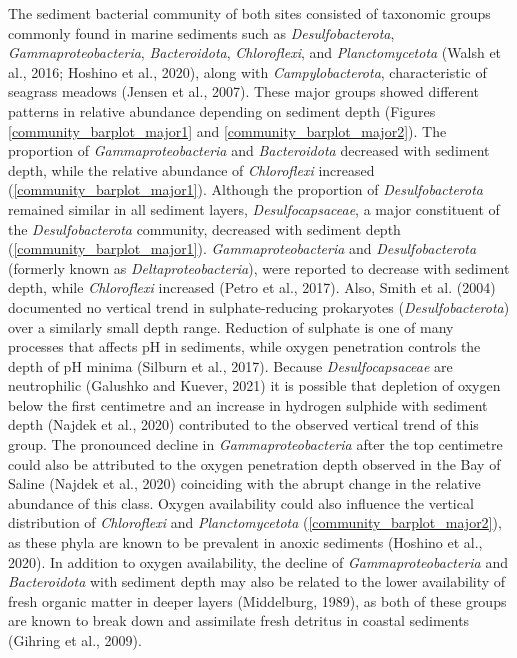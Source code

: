\documentclass[12pt,]{article}
\begin{document}
The sediment bacterial community of both sites consisted of taxonomic
groups commonly found in marine sediments such as
\emph{Desulfobacterota}, \emph{Gammaproteobacteria},
\emph{Bacteroidota}, \emph{Chloroflexi}, and \emph{Planctomycetota}
(Walsh et al., 2016; Hoshino et al., 2020), along with
\emph{Campylobacterota}, characteristic of seagrass meadows (Jensen et
al., 2007). These major groups showed different patterns in relative
abundance depending on sediment depth (Figures
\ref {community_barplot_major1} and \ref {community_barplot_major2}).
The proportion of \emph{Gammaproteobacteria} and \emph{Bacteroidota}
decreased with sediment depth, while the relative abundance of
\emph{Chloroflexi} increased (\autoref {community_barplot_major1}).
Although the proportion of \emph{Desulfobacterota} remained similar in
all sediment layers, \emph{Desulfocapsaceae}, a major constituent of the
\emph{Desulfobacterota} community, decreased with sediment depth
(\autoref {community_barplot_major1}). \emph{Gammaproteobacteria} and
\emph{Desulfobacterota} (formerly known as \emph{Deltaproteobacteria}),
were reported to decrease with sediment depth, while \emph{Chloroflexi}
increased (Petro et al., 2017). Also, Smith et al. (2004) documented no
vertical trend in sulphate-reducing prokaryotes
(\emph{Desulfobacterota}) over a similarly small depth range. Reduction
of sulphate is one of many processes that affects pH in sediments, while
oxygen penetration controls the depth of pH minima (Silburn et al.,
2017). Because \emph{Desulfocapsaceae} are neutrophilic (Galushko and
Kuever, 2021) it is possible that depletion of oxygen below the first
centimetre and an increase in hydrogen sulphide with sediment depth
(Najdek et al., 2020) contributed to the observed vertical trend of this
group. The pronounced decline in \emph{Gammaproteobacteria} after the
top centimetre could also be attributed to the oxygen penetration depth
observed in the Bay of Saline (Najdek et al., 2020) coinciding with the
abrupt change in the relative abundance of this class. Oxygen
availability could also influence the vertical distribution of
\emph{Chloroflexi} and \emph{Planctomycetota}
(\autoref {community_barplot_major2}), as these phyla are known to be
prevalent in anoxic sediments (Hoshino et al., 2020). In addition to
oxygen availability, the decline of \emph{Gammaproteobacteria} and
\emph{Bacteroidota} with sediment depth may also be related to the lower
availability of fresh organic matter in deeper layers (Middelburg,
1989), as both of these groups are known to break down and assimilate
fresh detritus in coastal sediments (Gihring et al., 2009).
\end{document}
